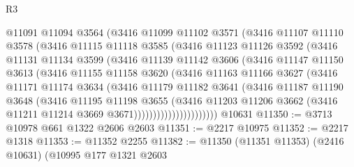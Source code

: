 \begin{lexlean}{R3}
\begin{coremodule}
                  @11091
                  @11094
                  @3564
                  (@3416
                    @11099
                    @11102
                    @3571
                    (@3416
                      @11107
                      @11110
                      @3578
                      (@3416
                        @11115
                        @11118
                        @3585
                        (@3416
                          @11123
                          @11126
                          @3592
                          (@3416
                            @11131
                            @11134
                            @3599
                            (@3416
                              @11139
                              @11142
                              @3606
                              (@3416
                                @11147
                                @11150
                                @3613
                                (@3416
                                  @11155
                                  @11158
                                  @3620
                                  (@3416
                                    @11163
                                    @11166
                                    @3627
                                    (@3416
                                      @11171
                                      @11174
                                      @3634
                                      (@3416
                                        @11179
                                        @11182
                                        @3641
                                        (@3416
                                          @11187
                                          @11190
                                          @3648
                                          (@3416
                                            @11195
                                            @11198
                                            @3655
                                            (@3416
                                              @11203
                                              @11206
                                              @3662
                                              (@3416 @11211 @11214 @3669 @3671))))))))))))))))))))))
    @10631
@11350 := @3713 @10978 @661 @1322 @2606 @2603
@11351 := @2217 @10975
@11352 := @2217 @1318
@11353 := @11352 @2255
@11382 := @11350
    (@11351 @11353)
    (@2416 @10631)
    (@10995
      @177
      @1321
      @2603

\end{coremodule}
\end{lexlean}
